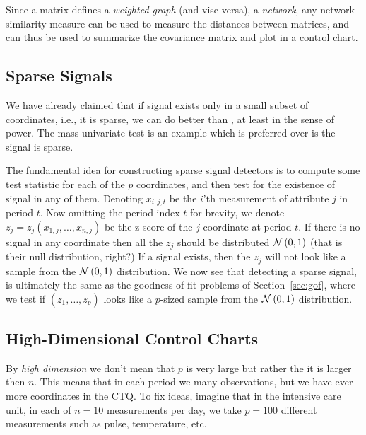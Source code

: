 \begin{extra}
Since a matrix defines a \emph{weighted graph} (and vise-versa), \aka a \emph{network}, any network similarity measure can be used to measure the distances between matrices, and can thus be used to summarize the covariance matrix and plot in a control chart.
\end{extra}





\subsection{Sparse Signals}

We have already claimed that if signal exists only in a small subset of coordinates, i.e., it is sparse, we can do better than \tsq, at least in the sense of power.
The mass-univariate test is an example which is preferred over \tsq is the signal is sparse.



\begin{extra}

The fundamental idea for constructing sparse signal detectors is to compute some test statistic for each of the $p$ coordinates, and then test for the existence of signal in any of them. 
Denoting $x_{i,j,t}$ be the $i$'th measurement of attribute $j$ in period $t$.
Now omitting the period index $t$ for brevity, we denote $z_j=z_j(x_{1,j},\dots,x_{n,j})$ be the z-score of the $j$ coordinate at period $t$. 
If there is no signal in any coordinate then all the $z_j$ should be distributed $\mathcal{N}\left(0,1\right)$ (that is their null distribution, right?)
If a signal exists, then the $z_j$ will not look like a sample from the $\mathcal{N}\left(0,1\right)$ distribution. 
We now see that detecting a sparse signal, is ultimately the same as the goodness of fit problems of Section~\ref{sec:gof}, where we test if $(z_1,\dots,z_p)$ looks like a $p$-sized sample from the $\mathcal{N}\left(0,1\right)$ distribution.

\end{extra}





\subsection{High-Dimensional Control Charts}

By \emph{high dimension} we don't mean that $p$ is very large but rather the it is larger then $n$.
This means that in each period we many observations, but we have ever more coordinates in the CTQ.
To fix ideas, imagine that in the intensive care unit, in each of $n=10$ measurements per day, we take $p=100$ different measurements such as pulse, temperature, etc.

